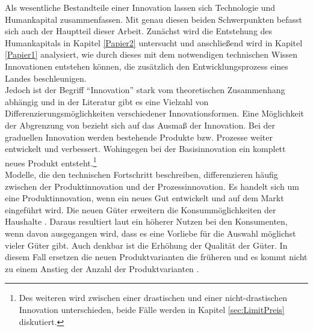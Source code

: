 %
Als wesentliche Bestandteile einer Innovation lassen sich Technologie und Humankapital zusammenfassen. Mit genau diesen beiden Schwerpunkten befasst sich auch der Hauptteil dieser Arbeit. Zunächst wird die Entstehung des Humankapitals in Kapitel \ref{Papier2} untersucht und anschließend wird in Kapitel \ref{Papier1} analysiert, wie durch dieses mit dem notwendigen technischen Wissen Innovationen entstehen können, die zusätzlich den Entwicklungsprozess eines Landes beschleunigen.\\
%
Jedoch ist der Begriff "`Innovation"' stark vom theoretischen Zusammenhang abhängig und in der Literatur gibt es eine Vielzahl von Differenzierungsmöglichkeiten verschiedener Innovationsformen. Eine Möglichkeit der Abgrenzung von \cite{Schebesch.1992} bezieht sich auf das Ausmaß der Innovation. Bei der graduellen Innovation werden bestehende Produkte bzw. Prozesse weiter entwickelt und verbessert. Wohingegen bei der Basisinnovation ein komplett neues Produkt entsteht.\footnote{Des weiteren wird zwischen einer drastischen und einer nicht-drastischen Innovation unterschieden, beide Fälle werden in Kapitel \ref{sec:LimitPreis} diskutiert.}\\
%
Modelle, die den technischen Fortschritt beschreiben, differenzieren häufig zwischen der Produktinnovation und der Prozessinnovation. Es handelt sich um eine Produktinnovation, wenn ein neues Gut entwickelt und auf dem Markt eingeführt wird.  Die neuen Güter erweitern die Konsummöglichkeiten der Haushalte \cite{Grossman.1991a,Grossman.1990b}. Daraus resultiert laut \cite{Krugman.79} ein höherer Nutzen bei den Konsumenten, wenn davon ausgegangen wird, dass es eine Vorliebe für die Auswahl möglichst vieler Güter gibt. Auch denkbar ist die Erhöhung der Qualität der Güter. In diesem Fall ersetzen die neuen Produktvarianten die früheren und es kommt nicht zu einem Anstieg der Anzahl der Produktvarianten \cite[Kapitel 12, S. 411]{Acemoglu.2009}. \\
%
